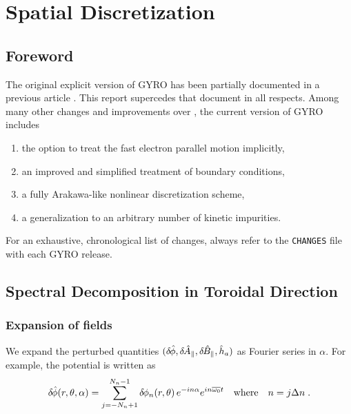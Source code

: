 \chapter{Spatial Discretization}\label{chap.discrete}

\section{Foreword}

The original explicit version of GYRO has been partially 
documented in a previous article \cite{candy:2003}.
This report supercedes that document in all respects.
Among many other changes and improvements over \cite{candy:2003}, 
the current version of GYRO includes 
\begin{enumerate}
\item
the option to treat the fast electron parallel motion 
implicitly,
\item
an improved and simplified treatment of boundary conditions,
\item
a fully Arakawa-like nonlinear discretization scheme,
\item
a generalization to an arbitrary number of kinetic impurities.
\end{enumerate}

For an exhaustive, chronological list of changes, always refer 
to the {\tt CHANGES} file with each GYRO release.

\section{Spectral Decomposition in Toroidal Direction}

\subsection{Expansion of fields}

We expand the perturbed quantities $(\delta \hskip -1pt \hat{\phi},\delta \hskip -1pt \hat{A}_\parallel,\delta \hskip -1pt \hat{B}_\parallel,\hat{h}_a)$ 
as Fourier series in $\alpha$.  For example, the potential 
is written as
%
\begin{equation}
\delta \hskip -1pt \hat{\phi}(r,\theta,\alpha) = 
 \sum_{j=-N_n+1}^{N_n-1} \delta \hskip -1pt \phi_n(r,\theta) \, e^{-i n \alpha} 
  e^{i n \overline{\omega_0} t}
  \quad\text{where}\quad n = j \Delta n \; .
\label{eq.spectral}
\end{equation}

